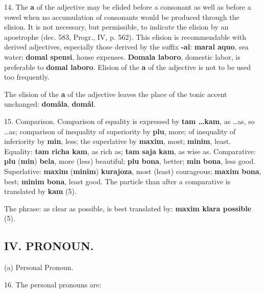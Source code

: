 14. The \textbf{a} of the adjective may be elided before a consonant as well as before a vowel when no accumulation of consonants would be produced through the elision. It is not necessary, but permissible, to indicate the elision by an apostrophe (dec. 583, Progr., IV, p. 562). This elision is recommendable with derived adjectives, especially those derived by the suffix \textbf{-al}: \textbf{maral aquo}, sea water; \textbf{domal spensi}, house expenses. \textbf{Domala laboro}, domestic labor, is preferable to \textbf{domal laboro}. Elision of the \textbf{a} of the adjective is not to be used too frequently. 

The elision of the \textbf{a} of the adjective leaves the place of the tonic accent unchanged: \textbf{domâla}, \textbf{domâl}. 

15. Comparison. Comparison of equality is expressed by \textbf{tam \ldots kam}, as \ldots as, so \ldots as; comparison of inequality of superiority by \textbf{plu}, more; of inequality of inferiority by \textbf{min}, less; the superlative by \textbf{maxim}, most; \textbf{minim}, least. Equality: \textbf{tam richa kam}, as rich as; \textbf{tam saja kam}, as wise as.
Comparative: \textbf{plu} (\textbf{min}) \textbf{bela}, more (less) beautiful; \textbf{plu bona}, better; \textbf{min bona}, less good. 
Superlative: \textbf{maxim} (\textbf{minim}) \textbf{kurajoza}, most (least) courageous; \textbf{maxim bona}, best; \textbf{minim bona}, least good. The particle than after a comparative is translated by \textbf{kam} (5). 

The phrase: as clear as possible, is best translated by: \textbf{maxim klara possible} (5).

\subsection*{IV. PRONOUN.}
\Centering (a) Personal Pronoun. \\ \justifying 

16. The personal pronouns are:

